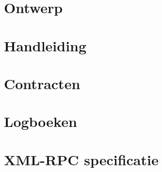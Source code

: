 \documentclass[a4paper,oneside,final]{memoir}
\begin{document}
\chapter{Ontwerp}
\label{chap:ontwerp}


\chapter{Handleiding}
\label{chap:installatie}


\chapter{Contracten}
\label{chap:contract}


\chapter{Logboeken}
\label{chap:logboeken}


\chapter{XML-RPC specificatie}
\label{chap:xmlrpc}
\begin{otherlanguage}{english}

\end{otherlanguage}
\end{document}
